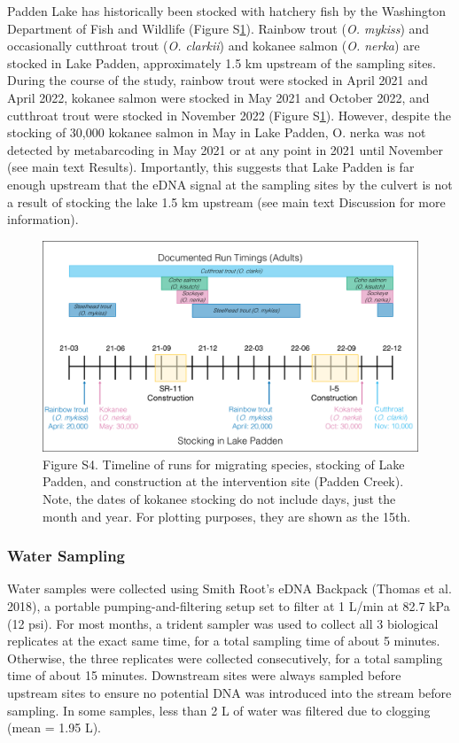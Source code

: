 \documentclass[
]{article}
\begin{document}
Padden Lake has historically been stocked with hatchery fish by the
Washington Department of Fish and Wildlife (Figure S\ref{fig:timeline}).
Rainbow trout (\emph{O. mykiss}) and occasionally cutthroat trout
(\emph{O. clarkii}) and kokanee salmon (\emph{O. nerka}) are stocked in
Lake Padden, approximately 1.5 km upstream of the sampling sites. During
the course of the study, rainbow trout were stocked in April 2021 and
April 2022, kokanee salmon were stocked in May 2021 and October 2022,
and cutthroat trout were stocked in November 2022 (Figure
S\ref{fig:timeline}). However, despite the stocking of 30,000 kokanee
salmon in May in Lake Padden, O. nerka was not detected by metabarcoding
in May 2021 or at any point in 2021 until November (see main text
Results). Importantly, this suggests that Lake Padden is far enough
upstream that the eDNA signal at the sampling sites by the culvert is
not a result of stocking the lake 1.5 km upstream (see main text
Discussion for more information).

\begin{figure}
\centering
\includegraphics{../Output/SupplementalFigures/TimeLine.pdf}
\caption{Figure S4. Timeline of runs for migrating species, stocking of
Lake Padden, and construction at the intervention site (Padden Creek).
Note, the dates of kokanee stocking do not include days, just the month
and year. For plotting purposes, they are shown as the
15th.\label{fig:timeline}}
\end{figure}

\hypertarget{water-sampling}{%
\subsubsection{Water Sampling}\label{water-sampling}}

Water samples were collected using Smith Root's eDNA Backpack (Thomas et
al. 2018), a portable pumping-and-filtering setup set to filter at 1
L/min at 82.7 kPa (12 psi). For most months, a trident sampler was used
to collect all 3 biological replicates at the exact same time, for a
total sampling time of about 5 minutes. Otherwise, the three replicates
were collected consecutively, for a total sampling time of about 15
minutes. Downstream sites were always sampled before upstream sites to
ensure no potential DNA was introduced into the stream before sampling.
In some samples, less than 2 L of water was filtered due to clogging
(mean = 1.95 L).
\end{document}
